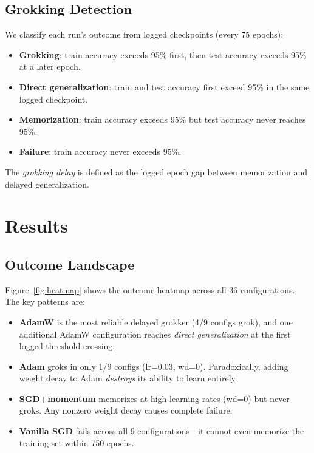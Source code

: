 \documentclass[11pt,a4paper]{article}
\begin{document}
\subsection{Grokking Detection}

We classify each run's outcome from logged checkpoints (every 75 epochs):
\begin{itemize}
    \item \textbf{Grokking}: train accuracy exceeds 95\% first, then test accuracy exceeds 95\% at a later epoch.
    \item \textbf{Direct generalization}: train and test accuracy first exceed 95\% in the same logged checkpoint.
    \item \textbf{Memorization}: train accuracy exceeds 95\% but test accuracy never reaches 95\%.
    \item \textbf{Failure}: train accuracy never exceeds 95\%.
\end{itemize}

The \emph{grokking delay} is defined as the logged epoch gap between memorization and delayed generalization.

\section{Results}

\subsection{Outcome Landscape}

Figure~\ref{fig:heatmap} shows the outcome heatmap across all 36 configurations. The key patterns are:

\begin{itemize}
    \item \textbf{AdamW} is the most reliable delayed grokker (4/9 configs grok), and one additional AdamW configuration reaches \emph{direct generalization} at the first logged threshold crossing.
    \item \textbf{Adam} groks in only 1/9 configs (lr=$0.03$, wd=$0$). Paradoxically, adding weight decay to Adam \emph{destroys} its ability to learn entirely.
    \item \textbf{SGD+momentum} memorizes at high learning rates (wd=$0$) but never groks. Any nonzero weight decay causes complete failure.
    \item \textbf{Vanilla SGD} fails across all 9 configurations---it cannot even memorize the training set within 750 epochs.
\end{itemize}
\end{document}
